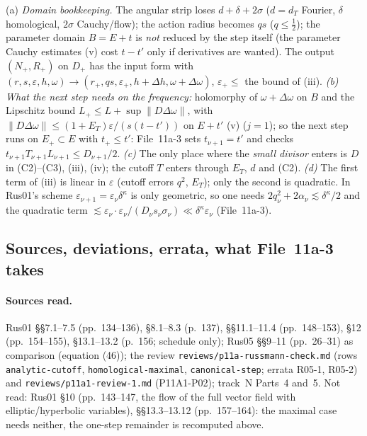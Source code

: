 \begin{remark}\label{bpP:p11a:step-reading}
(a) \emph{Domain bookkeeping.} The angular strip loses $d+\delta+2\sigma$ ($d=d_T$ Fourier, $\delta$ homological, $2\sigma$ Cauchy/flow); the action radius becomes $qs$ ($q\le\frac12$); the parameter domain $B=E+t$ is \emph{not} reduced by the step itself (the parameter Cauchy estimates (v) cost $t-t'$ only if derivatives are wanted). The output $(N_+,R_+)$ on $D_+$ has the input form with $(r,s,\varepsilon,h,\omega)\to(r_+,qs,\varepsilon_+,h+\Delta h,\omega+\Delta\omega)$, $\varepsilon_+\le$ the bound of (iii). \emph{(b) What the next step needs on the frequency:} holomorphy of $\omega+\Delta\omega$ on $B$ and the Lipschitz bound $L_+\le L+\sup\lVert D\Delta\omega\rVert$, with $\lVert D\Delta\omega\rVert\le(1+E_T)\varepsilon/(s(t-t'))$ on $E+t'$ (v) ($j=1$); so the next step runs on $E_+\subset E$ with $t_+\le t'$: File~11a-3 sets $t_{\nu+1}=t'$ and checks $t_{\nu+1}T_{\nu+1}L_{\nu+1}\le D_{\nu+1}/2$. \emph{(c)} The only place where the \emph{small divisor} enters is $D$ in (C2)--(C3), (iii), (iv); the cutoff $T$ enters through $E_T$, $d$ and (C2). \emph{(d)} The first term of (iii) is linear in $\varepsilon$ (cutoff errors $q^2$, $E_T$); only the second is quadratic. In Rus01's scheme $\varepsilon_{\nu+1}=\varepsilon_\nu\delta^{\kappa}$ is only geometric, so one needs $2q_\nu^2+2\alpha_\nu\lesssim\delta^{\kappa}/2$ and the quadratic term $\lesssim\varepsilon_\nu\cdot\varepsilon_\nu/(D_\nu s_\nu\sigma_\nu)\ll\delta^\kappa\varepsilon_\nu$ (File~11a-3).
\end{remark}

\subsection{Sources, deviations, errata, what File~11a-3 takes}\label{bpP:p11a:notes2}

\paragraph{Sources read.} Rus01 \S\S7.1--7.5 (pp.~134--136), \S8.1--8.3 (p.~137), \S\S11.1--11.4 (pp.~148--153), \S12 (pp.~154--155), \S13.1--13.2 (p.~156; schedule only); Rus05 \S\S9--11 (pp.~26--31) as comparison (equation (46)); the review \texttt{reviews/p11a-russmann-check.md} (rows \texttt{analytic-cutoff}, \texttt{homological-maximal}, \texttt{canonical-step}; errata R05-1, R05-2) and \texttt{reviews/p11a1-review-1.md} (P11A1-P02); track~N Parts~4 and~5. Not read: Rus01 \S10 (pp.~143--147, the flow of the full vector field with elliptic/hyperbolic variables), \S\S13.3--13.12 (pp.~157--164): the maximal case needs neither, the one-step remainder is recomputed above.

